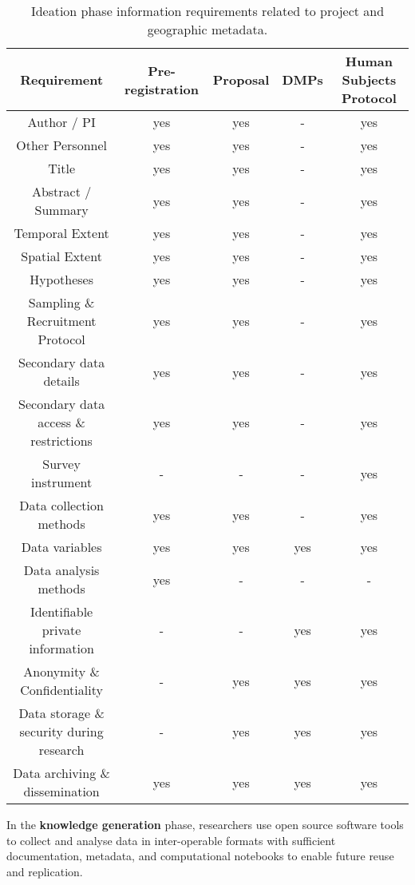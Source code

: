 \documentclass{isprs} %
\begin{document}
\begin{table*}[h]
	\centering
		\begin{tabular}{|c|c|c|c|c|}\hline
		   Requirement&Pre-registration&Proposal&DMPs&Human Subjects Protocol\\\hline
		     Author / PI                            & yes & yes & - & yes \\
		     Other Personnel                        & yes & yes & - & yes \\
    		 Title                                  & yes & yes & - & yes \\
    		 Abstract / Summary                     & yes & yes & - & yes \\
    		 Temporal Extent                        & yes & yes & - & yes \\
    		 Spatial Extent                         & yes & yes & - & yes \\
    		 Hypotheses                             & yes & yes & - & yes \\
    		 Sampling \& Recruitment Protocol        & yes & yes & - & yes \\
    		 Secondary data details                 & yes & yes & - & yes \\
    		 Secondary data access \& restrictions   & yes & yes & - & yes \\
    		 Survey instrument                      & - & - & - & yes \\
    		 Data collection methods                & yes & yes & - & yes \\
    		 Data variables                         & yes & yes & yes & yes \\
    		 Data analysis methods                  & yes & - & - & - \\
    		 Identifiable private information       & - & - & yes & yes \\
    		 Anonymity \& Confidentiality            & - & yes & yes & yes \\
    		 Data storage \& security during research& - & yes & yes & yes \\
    		 Data archiving \& dissemination         & yes & yes & yes & yes \\\hline
		\end{tabular}
	\caption{Ideation phase information requirements related to project and geographic metadata.}
\label{tab:Ideation_Info}
\end{table*}

In the \textbf{knowledge generation} phase, researchers use open source software tools to collect and analyse data in inter-operable formats with sufficient documentation, metadata, and computational notebooks to enable future reuse and replication.
\end{document}
